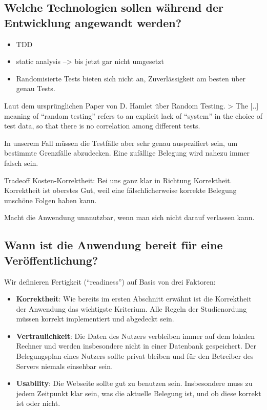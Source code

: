\documentclass[ngerman]{article}
\begin{document}
\subsection{Welche Technologien sollen während der Entwicklung angewandt werden?}

\begin{itemize}
    \item
        TDD
    \item
        static analysis --\textgreater{} bis jetzt gar nicht umgesetzt
    \item
        Randomisierte Tests bieten sich nicht an, Zuverlässigkeit am besten über genau Tests.
\end{itemize}

Laut dem ursprünglichen Paper von D. Hamlet über Random Testing.
\textgreater{} The {[}..{]} meaning of ``random testing'' refers to an
explicit lack of ``system'' in the choice of test data, so that there is
no correlation among different tests.

In unserem Fall müssen die Testfälle aber sehr genau auspezifiert sein, um bestimmte Grenzfälle abzudecken. Eine zufällige Belegung wird nahezu immer falsch sein.

Tradeoff Kosten-Korrektheit: Bei uns ganz klar in Richtung Korrektheit.
Korrektheit ist oberstes Gut, weil eine fälschlicherweise korrekte Belegung unschöne Folgen haben kann.

Macht die Anwendung unnnutzbar, wenn man sich nicht darauf verlassen kann.

\subsection{Wann ist die Anwendung bereit für eine Veröffentlichung?}

Wir definieren Fertigkeit (``readiness'') auf Basis von drei Faktoren:

\begin{itemize}
    \item \textbf{Korrektheit}:
        Wie bereits im ersten Abschnitt erwähnt ist die Korrektheit der Anwendung das wichtigste Kriterium.
        Alle Regeln der Studienordung müssen korrekt implementiert und abgedeckt sein.
    \item \textbf{Vertraulichkeit}:
        Die Daten des Nutzers verbleiben immer auf dem lokalen Rechner und werden insbesondere nicht in einer Datenbank gespeichert.
        Der Belegungsplan eines Nutzers sollte privat bleiben und für den Betreiber des Servers niemals einsehbar sein.
    \item \textbf{Usability}:
        Die Webseite sollte gut zu benutzen sein.
        Insbesondere muss zu jedem Zeitpunkt klar sein, was die aktuelle Belegung ist, und ob diese korrekt ist oder nicht.
\end{itemize}
\end{document}
